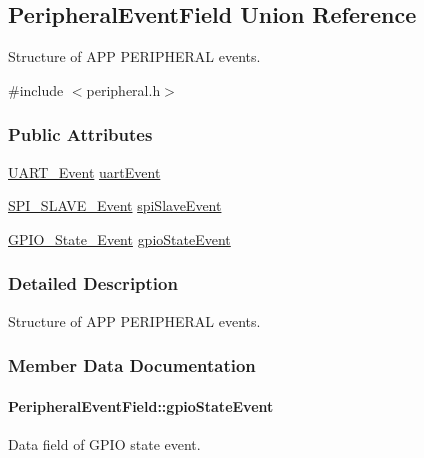 \hypertarget{union_peripheral_event_field}{}\subsection{Peripheral\+Event\+Field Union Reference}
\label{union_peripheral_event_field}


Structure of A\+PP P\+E\+R\+I\+P\+H\+E\+R\+AL events.  




{\ttfamily \#include $<$peripheral.\+h$>$}

\subsubsection*{Public Attributes}
\begin{DoxyCompactItemize}
\item 
\hyperlink{struct_u_a_r_t___event}{U\+A\+R\+T\+\_\+\+Event} \hyperlink{union_peripheral_event_field_a0745f354d8d3a81a2d6c8cda740d105f}{uart\+Event}
\item 
\hyperlink{struct_s_p_i___s_l_a_v_e___event}{S\+P\+I\+\_\+\+S\+L\+A\+V\+E\+\_\+\+Event} \hyperlink{union_peripheral_event_field_ac529d482b7d9dbf91a8d30396647c30e}{spi\+Slave\+Event}
\item 
\hyperlink{struct_g_p_i_o___state___event}{G\+P\+I\+O\+\_\+\+State\+\_\+\+Event} \hyperlink{union_peripheral_event_field_a1bccd6b31e400c2bbc0fc787a6ea2e3a}{gpio\+State\+Event}
\end{DoxyCompactItemize}


\subsubsection{Detailed Description}
Structure of A\+PP P\+E\+R\+I\+P\+H\+E\+R\+AL events. 

\subsubsection{Member Data Documentation}
\paragraph[{\texorpdfstring{gpio\+State\+Event}{gpioStateEvent}}]{ Peripheral\+Event\+Field\+::gpio\+State\+Event}\hypertarget{union_peripheral_event_field_a1bccd6b31e400c2bbc0fc787a6ea2e3a}{}\label{union_peripheral_event_field_a1bccd6b31e400c2bbc0fc787a6ea2e3a}
Data field of G\+P\+IO state event. 
